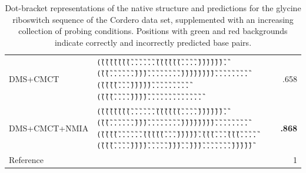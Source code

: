 \documentclass[a4,center,fleqn]{NAR}
\begin{document}
\begin{table}
\begin{adjustbox}{max width=\linewidth}
\begin{tabular}{@{}llr@{}}
			DMS+CMCT & {\tt \G{(}\G{(}\G{(}\G{(}\G{(}\G{(}\G{(}\G{(}\G{.}\G{.}\G{.}\G{.}\G{.}\G{.}\G{(}\G{(}\G{(}\G{(}\G{(}\G{(}\G{.}\G{.}\G{.}\G{.}\G{)}\G{)}\G{)}\G{)}\G{)}\G{)}\G{.}\G{(}\G{(}\G{(}\B{(}\B{(}\B{(}\B{(}\B{(}\B{.}\B{.}\G{.}\G{.}\G{.}\G{.}\B{)}\B{)}\B{)}\B{)}\B{)}\G{.}\G{.}\G{)}\G{)}\G{)}\G{.}\G{.}\G{.}\G{.}\G{.}\G{.}\G{.}\G{.}\G{)}\G{)}\G{)}\G{)}\G{)}\G{)}\G{)}\G{)}\G{.}\G{.}\G{.}\G{.}\G{.}\G{.}\G{.}\B{(}\B{(}\B{.}\B{.}\B{.}\B{.}\B{(}\B{(}\B{(}\B{(}\B{(}\G{.}\G{(}\G{(}\G{(}\G{(}\G{(}\B{(}\G{.}\G{.}\G{.}\B{)}\G{)}\G{)}\G{)}\G{)}\G{)}\G{.}\B{.}\B{.}\B{.}\G{.}\G{.}\G{.}\G{.}\B{.}\B{.}\B{.}\G{.}\G{.}\G{.}\G{.}\G{(}\G{(}\G{(}\G{(}\G{.}\G{.}\G{.}\G{.}\G{)}\G{)}\G{)}\G{)}\G{.}\G{.}\G{.}\G{.}\G{.}\B{)}\B{)}\B{)}\B{)}\B{)}\G{.}\B{)}\B{)}\B{.}\G{.}\G{.}\G{.}\G{.}\G{.}\G{.}\G{.}\B{.}\B{.}\B{.}\B{.}\B{.}}&.658\\
			DMS+CMCT+NMIA & {\tt \G{(}\G{(}\G{(}\G{(}\G{(}\G{(}\G{(}\G{(}\G{.}\G{.}\G{.}\G{.}\G{.}\G{.}\G{(}\G{(}\G{(}\G{(}\G{(}\G{(}\G{.}\G{.}\G{.}\G{.}\G{)}\G{)}\G{)}\G{)}\G{)}\G{)}\G{.}\G{(}\G{(}\G{(}\B{(}\B{(}\B{(}\B{(}\B{(}\B{.}\B{.}\G{.}\G{.}\G{.}\G{.}\B{)}\B{)}\B{)}\B{)}\B{)}\G{.}\G{.}\G{)}\G{)}\G{)}\G{.}\G{.}\G{.}\G{.}\G{.}\G{.}\G{.}\G{.}\G{)}\G{)}\G{)}\G{)}\G{)}\G{)}\G{)}\G{)}\G{.}\G{.}\G{.}\G{.}\G{.}\G{.}\G{.}\G{.}\G{(}\G{(}\G{(}\G{(}\G{(}\G{.}\G{.}\G{.}\G{.}\G{.}\G{.}\G{(}\G{(}\G{(}\G{(}\G{(}\B{(}\G{.}\G{.}\G{.}\B{)}\G{)}\G{)}\G{)}\G{)}\G{)}\G{.}\G{(}\G{(}\G{(}\G{.}\G{.}\G{.}\B{(}\G{(}\G{(}\G{(}\G{.}\G{.}\G{.}\G{.}\G{(}\G{(}\G{(}\G{(}\G{.}\G{.}\G{.}\G{.}\G{)}\G{)}\G{)}\G{)}\G{.}\G{.}\G{.}\G{.}\G{.}\G{)}\G{)}\G{)}\B{)}\G{.}\G{.}\G{)}\G{)}\G{)}\G{.}\G{.}\G{.}\G{.}\G{.}\G{.}\G{.}\G{)}\G{)}\G{)}\G{)}\G{)}} & \textbf{.868}\\ \midrule
			Reference& {\tt \Base{((((((((......((((((....)))))).(((....(((.....)))...)))........))))))))........(((((......(((((.....))))).(((....(((....((((....)))).....)))...))).......)))))}}& 1\\
			\bottomrule
		\end{tabular}
	\end{adjustbox}\\
	\caption{Dot-bracket representations of the native structure and \OurTool{} predictions for the glycine riboswitch sequence of the Cordero\etal\cite{Cordero2012} data set, supplemented with an increasing collection of probing conditions.  Positions with green and red backgrounds indicate correctly and incorrectly predicted base pairs.}\label{fig:glycine_example}
\end{table}
\end{document}
